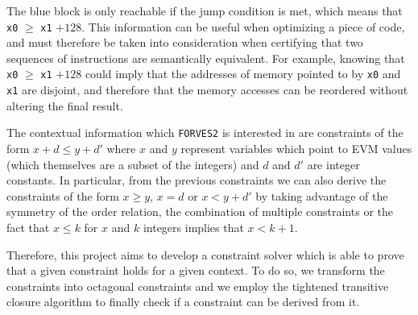 \begin{center}
\end{center}

The blue block is only reachable if the jump condition is met, which means that \verb|x0| $\ge$ 
\verb|x1| $+ 128$. This information can be useful when optimizing a piece of code, and must therefore
be taken into consideration when certifying that two sequences of instructions are semantically 
equivalent. For example, knowing that \verb|x0| $\ge$ \verb|x1| $+ 128$ could imply that the addresses
of memory pointed to by \verb|x0| and \verb|x1| are disjoint, and therefore that the memory accesses
can be reordered without altering the final result.

The contextual information which \verb|FORVES2| is interested in are constraints of the form 
$x + d \le y + d'$ where $x$ and $y$ represent variables which point to EVM values (which themselves
are a subset of the integers) and $d$ and $d'$ are integer constants. In particular, from the previous
constraints we can also derive the constraints of the form $x \ge y$, $x = d$ or $x < y + d'$ by taking
advantage of the symmetry of the order relation, the combination of multiple constraints or the fact
that $x \le k$ for $x$ and $k$ integers implies that $x < k + 1$. 

Therefore, this project aims to develop a constraint solver which is able to prove that a given
constraint holds for a given context. To do so, we transform the constraints into octagonal constraints
and we employ the tightened transitive closure algorithm to finally check if a constraint can be derived
from it.

